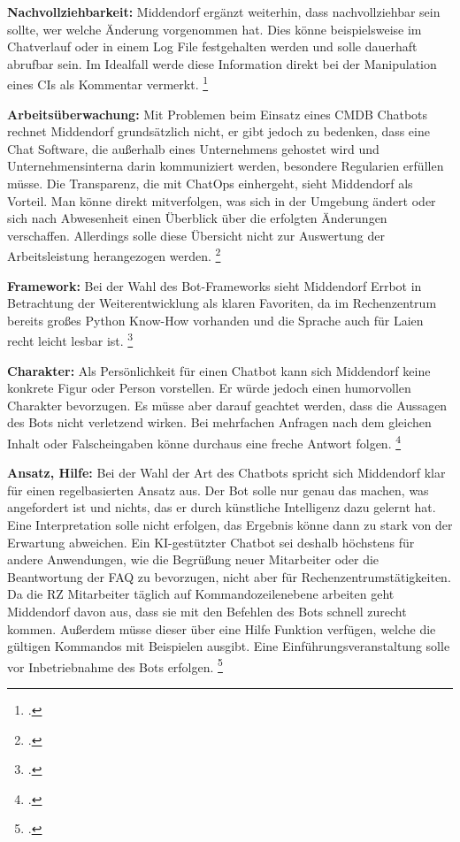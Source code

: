 \textbf{Nachvollziehbarkeit: }Middendorf ergänzt weiterhin, dass nachvollziehbar sein sollte, wer welche Änderung vorgenommen hat. Dies könne beispielsweise im Chatverlauf oder in einem Log File festgehalten werden und solle dauerhaft abrufbar sein. Im Idealfall werde diese Information direkt bei der Manipulation eines \acs{CI}s als Kommentar vermerkt.
\footcite[Vgl.][o. \pno]{Midd_2019}

\textbf{Arbeitsüberwachung: }Mit Problemen beim Einsatz eines \acs{CMDB} Chatbots rechnet Middendorf grundsätzlich nicht, er gibt jedoch zu bedenken, dass eine Chat Software, die außerhalb eines Unternehmens gehostet wird und Unternehmensinterna darin kommuniziert werden, besondere Regularien erfüllen müsse. Die Transparenz, die mit ChatOps einhergeht, sieht Middendorf als Vorteil. Man könne direkt mitverfolgen, was sich in der Umgebung ändert oder sich nach Abwesenheit einen Überblick über die erfolgten Änderungen verschaffen. Allerdings solle diese Übersicht nicht zur Auswertung der Arbeitsleistung herangezogen werden.
\footcite[Vgl.][o. \pno]{Midd_2019}

\textbf{Framework: }Bei der Wahl des Bot-Frameworks sieht Middendorf Errbot in Betrachtung der Weiterentwicklung als klaren Favoriten, da im Rechenzentrum bereits großes Python Know-How vorhanden und die Sprache auch für Laien recht leicht lesbar ist.
\footcite[Vgl.][o. \pno]{Midd_2019}

\textbf{Charakter: }Als Persönlichkeit für einen Chatbot kann sich Middendorf keine konkrete Figur oder Person vorstellen. Er würde jedoch einen humorvollen Charakter bevorzugen. Es müsse aber darauf geachtet werden, dass die Aussagen des Bots nicht verletzend wirken. Bei mehrfachen Anfragen nach dem gleichen Inhalt oder Falscheingaben könne durchaus eine freche Antwort folgen. 
\footcite[Vgl.][o. \pno]{Midd_2019}

\textbf{Ansatz, Hilfe: }Bei der Wahl der Art des Chatbots spricht sich Middendorf klar für einen regelbasierten Ansatz aus. Der Bot solle nur genau das machen, was angefordert ist und nichts, das er durch künstliche Intelligenz dazu gelernt hat. Eine Interpretation solle nicht erfolgen, das Ergebnis könne dann zu stark von der Erwartung abweichen. Ein KI-gestützter Chatbot sei deshalb höchstens für andere Anwendungen, wie die Begrüßung neuer Mitarbeiter oder die Beantwortung der FAQ zu bevorzugen, nicht aber für Rechenzentrumstätigkeiten.\\
Da die RZ Mitarbeiter täglich auf Kommandozeilenebene arbeiten geht Middendorf davon aus, dass sie mit den Befehlen des Bots schnell zurecht kommen. Außerdem müsse dieser über eine Hilfe Funktion verfügen, welche die gültigen Kommandos mit Beispielen ausgibt.  Eine Einführungsveranstaltung solle vor Inbetriebnahme des Bots erfolgen.
\footcite[Vgl.][o. \pno]{Midd_2019}

